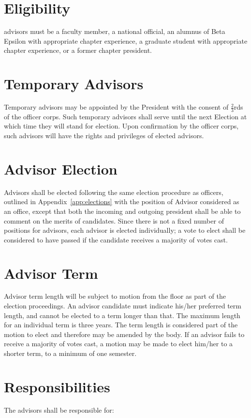 \section{Eligibility}
advisors must be a faculty member, a national official, an alumnus of Beta Epsilon with appropriate chapter experience, a graduate student with appropriate chapter experience, or a former chapter president. 

\section{Temporary Advisors}
Temporary advisors may be appointed by the President with the consent of $\frac{2}{3}$rds of the officer corps. Such temporary advisors shall serve until the next Election at which time they will stand for election. Upon confirmation by the officer corps, such advisors will have the rights and privileges of elected advisors. 

\section{Advisor Election}
Advisors shall be elected following the same election procedure as officers, outlined in Appendix~\ref{app:elections} with the position of Advisor considered as an office, except that both the incoming and outgoing president shall be able to comment on the merits of candidates. Since there is not a fixed number of positions for advisors, each advisor is elected individually; a vote to elect shall be considered to have passed if the candidate receives a majority of votes cast.

\section{Advisor Term}
Advisor term length will be subject to motion from the floor as part of the election proceedings. An advisor candidate must indicate his/her preferred term length, and cannot be elected to a term longer than that. The maximum length for an individual term is three years. The term length is considered part of the motion to elect and therefore may be amended by the body. If an advisor fails to receive a majority of votes cast, a motion may be made to elect him/her to a shorter term, to a minimum of one semester.

\section{Responsibilities}
The advisors shall be responsible for:

